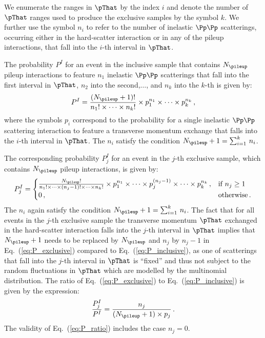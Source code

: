 We enumerate the ranges in $\pThat$ by the index $i$ and denote the number of $\pThat$ ranges used to produce the exclusive samples by the symbol $k$.
We further use the symbol $n_{i}$ to refer to the number of inelastic $\Pp\Pp$ scatterings,
occurring either in the hard-scatter interaction or in any of the pileup interactions,
that fall into the $i$-th interval in $\pThat$.

The probability $P^{I}$ for an event in the inclusive sample that contains $N_{\pileup}$ pileup interactions
to feature $n_{1}$ inelastic $\Pp\Pp$ scatterings that fall into the first interval in $\pThat$, $n_{2}$ into the second,$\dots$, and $n_{k}$ into the $k$-th 
is given by:
\begin{equation}
P^{I} = \frac{(N_{\pileup} + 1)!}{n_{1}! \times \dots \times n_{k}!} \times p_{1}^{n_{1}} \times \dots \times p_{k}^{n_{k}} \, ,
\label{eq:P_inclusive}
\end{equation}
where the symbols $p_{i}$ correspond to the probability for a single inelastic $\Pp\Pp$ scattering interaction to feature a transverse momentum exchange that falls into the $i$-th interval in $\pThat$.
The $n_{i}$ satisfy the condition $N_{\pileup} + 1 = \sum_{i=1}^{k} \, n_{i}$.

The corresponding probability $P_{j}^{I}$ for an event in the $j$-th exclusive sample, which contains $N_{\pileup}$ pileup interactions,
is given by:
\begin{equation}
P_{j}^{I} = \begin{cases}
\frac{N_{\pileup}!}{n_{1}! \times \dots \times (n_{j} - 1)! \times \dots \times n_{k}!} \times p_{1}^{n_{1}} \times \dots \times p_{j}^{(n_{j} - 1)} \times \dots \times p_{k}^{n_{k}} \, ,
  & \text{if $n_{j} \geq 1$} \\
0 \, , & \text{otherwise} \, .
\end{cases}
\label{eq:P_exclusive}
\end{equation}
The $n_{i}$ again satisfy the condition $N_{\pileup} + 1 = \sum_{i=1}^{k} \, n_{i}$.
The fact that for all events in the $j$-th exclusive sample the transverse momentum $\pThat$ exchanged in the hard-scatter interaction falls into the $j$-th interval in $\pThat$
implies that $N_{\pileup} + 1$ needs to be replaced by $N_{\pileup}$ and $n_{j}$ by $n_{j} - 1$ in Eq.~(\ref{eq:P_exclusive}) compared to Eq.~(\ref{eq:P_inclusive}),
as one of scatterings that fall into the $j$-th interval in $\pThat$ is ``fixed'' and thus not subject to the random fluctuations in $\pThat$ which are modelled by the multinomial distribution.
The ratio of Eq.~(\ref{eq:P_exclusive}) to Eq.~(\ref{eq:P_inclusive}) is given by the expression:
\begin{equation}
\frac{P_{j}^{I}}{P^{I}} = \frac{n_{j}}{(N_{\pileup} + 1) \times p_{j}} \, .
\label{eq:P_ratio}
\end{equation}
The validity of Eq.~(\ref{eq:P_ratio}) includes the case $n_{j} = 0$.

